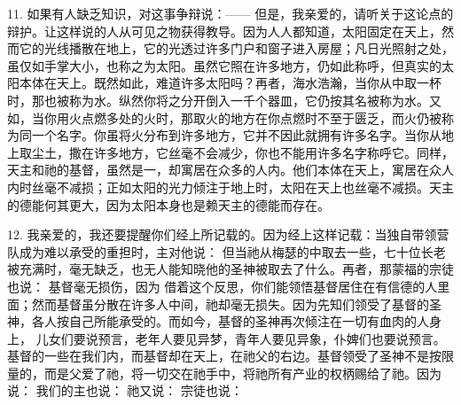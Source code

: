 11. 如果有人缺乏知识，对这事争辩说：—— 但是，我亲爱的，请听关于这论点的辩护。让这样说的人从可见之物获得教导。因为人人都知道，太阳固定在天上，然而它的光线播散在地上，它的光透过许多门户和窗子进入房屋；凡日光照射之处，虽仅如手掌大小，也称之为太阳。虽然它照在许多地方，仍如此称呼，但真实的太阳本体在天上。既然如此，难道许多太阳吗？再者，海水浩瀚，当你从中取一杯时，那也被称为水。纵然你将之分开倒入一千个器皿，它仍按其名被称为水。又如，当你用火点燃多处的火时，那取火的地方在你点燃时不至于匮乏，而火仍被称为同一个名字。你虽将火分布到许多地方，它并不因此就拥有许多名字。当你从地上取尘土，撒在许多地方，它丝毫不会减少，你也不能用许多名字称呼它。同样，天主和祂的基督，虽然是一，却寓居在众多的人内。他们本体在天上，寓居在众人内时丝毫不减损；正如太阳的光力倾注于地上时，太阳在天上也丝毫不减损。天主的德能何其更大，因为太阳本身也是赖天主的德能而存在。\par

12. 我亲爱的，我还要提醒你们经上所记载的。因为经上这样记载：当独自带领营队成为难以承受的重担时，主对他说： 但当祂从梅瑟的中取去一些，七十位长老被充满时，毫无缺乏，也无人能知晓他的圣神被取去了什么。再者，那蒙福的宗徒也说： 基督毫无损伤，因为 借着这个反思，你们能领悟基督居住在有信德的人里面；然而基督虽分散在许多人中间，祂却毫无损失。因为先知们领受了基督的圣神，各人按自己所能承受的。而如今，基督的圣神再次倾注在一切有血肉的人身上， 儿女们要说预言，老年人要见异梦，青年人要见异象，仆婢们也要说预言。基督的一些在我们内，而基督却在天上，在祂父的右边。基督领受了圣神不是按限量的，而是父爱了祂，将一切交在祂手中，将祂所有产业的权柄赐给了祂。因为说： 我们的主也说： 祂又说： 宗徒也说：\par

